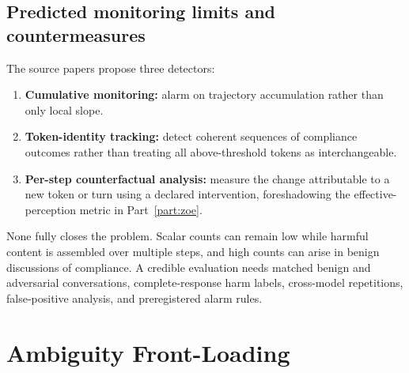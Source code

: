 \subsection{Predicted monitoring limits and countermeasures}
The source papers propose three detectors:
\begin{enumerate}
  \item \textbf{Cumulative monitoring:} alarm on trajectory accumulation rather than only local slope.
  \item \textbf{Token-identity tracking:} detect coherent sequences of compliance outcomes rather than treating all above-threshold tokens as interchangeable.
  \item \textbf{Per-step counterfactual analysis:} measure the change attributable to a new token or turn using a declared intervention, foreshadowing the effective-perception metric in Part~\ref{part:zoe}.
\end{enumerate}
None fully closes the problem. Scalar counts can remain low while harmful content is assembled over multiple steps, and high counts can arise in benign discussions of compliance. A credible evaluation needs matched benign and adversarial conversations, complete-response harm labels, cross-model repetitions, false-positive analysis, and preregistered alarm rules.

\section{Ambiguity Front-Loading}
